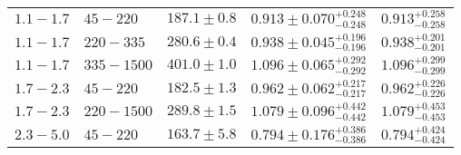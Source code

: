 \begin{table}[!htb]
\begin{center}
\begin{tabular}{cllll}
      $1.1 - 1.7$ & $45 - 220$ & $187.1 \pm 0.8$ & $0.913 \pm 0.070^{+0.248}_{-0.248}$ & $0.913^{+0.258}_{-0.258} $ \\
      $1.1 - 1.7$ & $220 - 335$ & $280.6 \pm 0.4$ & $0.938 \pm 0.045^{+0.196}_{-0.196}$ & $0.938^{+0.201}_{-0.201} $ \\
      $1.1 - 1.7$ & $335 - 1500$ & $401.0 \pm 1.0$ & $1.096 \pm 0.065^{+0.292}_{-0.292}$ & $1.096^{+0.299}_{-0.299} $ \\
      \midrule
      $1.7 - 2.3$ & $45 - 220$ & $182.5 \pm 1.3$ & $0.962 \pm 0.062^{+0.217}_{-0.217}$ & $0.962^{+0.226}_{-0.226} $ \\
      $1.7 - 2.3$ & $220 - 1500$ & $289.8 \pm 1.5$ & $1.079 \pm 0.096^{+0.442}_{-0.442}$ & $1.079^{+0.453}_{-0.453} $ \\
      \midrule
      $2.3 - 5.0$ & $45 - 220$ & $163.7 \pm 5.8$ & $0.794 \pm 0.176^{+0.386}_{-0.386}$ & $0.794^{+0.424}_{-0.424} $ \\
      \bottomrule
    \end{tabular}
  \end{center}


\end{table}
